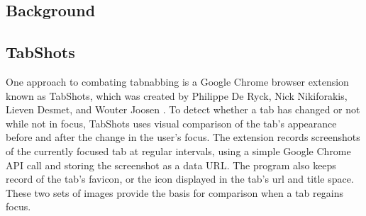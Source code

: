 \documentclass[12pt]{article}
\begin{document}
\begin{doublespace}
\begin{comment}
Phishing attacks are becoming more common as web use increases, and as users become more aware of phishing attacks, phishing techniques adapt to continue to be effective. Tabnabbing is one such new technique that has emerged recently and is effective even against users that have been trained to only give sensitive information to trusted websites.
\end{comment}

\section{Background}
\begin{comment}
Phishing attacks are not a new occurrence; they have been around since there has been personal data or credentials to steal. However, ``tabnabbing'' is a relatively recent addition to the list of phishing techniques, coined by Aza Raskin in 2010 \cite{Raskin}. Tabnabbing is a phishing technique that takes advantage of two commonly exhibited user behaviors for modern browser usage. The first is that users often open several tabs in a browser window and navigate between them without closing previous tabs. The second is the user tendency to leave browsers open for extended periods of time while away from their computers in order to access the pages more easily upon their return. 
\end{comment}



\subsection{TabShots}
\begin{comment}
One approach to combating tabnabbing is an extension known as TabShots, a program created by Philippe De Ryck, Nick Nikiforakis, Lieven Desmet, and Wouter Joosen \cite{TabShots}. TabShots continuously takes screenshots of tab and compares them to the previous ones and highlights any changes in red yellow or green depending on how many changes were made. When the user navigates back to a tab that has been altered in a tabnabbing attack, they will see the highlighted portions of the screen and receive a notification that the tab has been altered. 
Performance inpact on larger screens
Relies on user to make decision
\end{comment}

One approach to combating tabnabbing is a Google Chrome browser extension known as TabShots, which was created by Philippe De Ryck, Nick Nikiforakis, Lieven Desmet, and Wouter Joosen \cite{TabShots}.  To detect whether a tab has changed or not while not in focus, TabShots uses visual comparison of the tab's appearance before and after the change in the user's focus.  The extension records screenshots of the currently focused tab at regular intervals, using a simple Google Chrome API call and storing the screenshot as a data URL.  The program also keeps record of the tab's favicon, or the icon displayed in the tab's url and title space.  These two sets of images provide the basis for comparison when a tab regains focus.


\end{doublespace}
\end{document}
